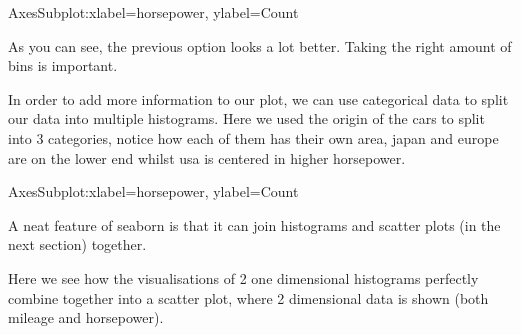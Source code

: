 \documentclass[letterpaper,10pt,english]{jupyterBook}
\begin{document}
\begin{sphinxVerbatim}[commandchars=\\\{\}]
\PYGZlt{}AxesSubplot:xlabel=\PYGZsq{}horsepower\PYGZsq{}, ylabel=\PYGZsq{}Count\PYGZsq{}\PYGZgt{}
\end{sphinxVerbatim}

\noindent{}

\sphinxAtStartPar
As you can see, the previous option looks a lot better.
Taking the right amount of bins is important.

\sphinxAtStartPar
In order to add more information to our plot, we can use categorical data to split our data into multiple histograms.
Here we used the origin of the cars to split into 3 categories, notice how each of them has their own area, japan and europe are on the lower end whilst usa is centered in higher horsepower.

\begin{sphinxVerbatim}[commandchars=\\\{\}]
    
\end{sphinxVerbatim}

\begin{sphinxVerbatim}[commandchars=\\\{\}]
\PYGZlt{}AxesSubplot:xlabel=\PYGZsq{}horsepower\PYGZsq{}, ylabel=\PYGZsq{}Count\PYGZsq{}\PYGZgt{}
\end{sphinxVerbatim}

\noindent{}

\sphinxAtStartPar
A neat feature of seaborn is that it can join histograms and scatter plots (in the next section) together.

\sphinxAtStartPar
Here we see how the visualisations of 2 one dimensional histograms perfectly combine together into a scatter plot, where 2 dimensional data is shown (both mileage and horsepower).

\begin{sphinxVerbatim}[commandchars=\\\{\}]
  
\end{sphinxVerbatim}
\end{document}
